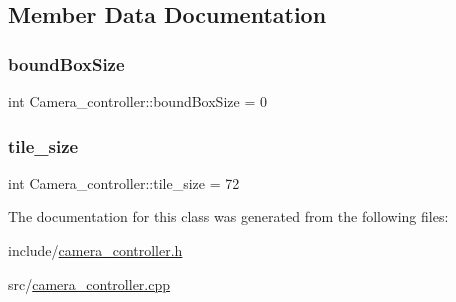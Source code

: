 \subsection{Member Data Documentation}
\mbox{\label{classCamera__controller_a3932aa7665e9edc834373a3e2f42f0e1}} 
\subsubsection{\texorpdfstring{bound\+Box\+Size}{boundBoxSize}}
{\footnotesize\ttfamily int Camera\+\_\+controller\+::bound\+Box\+Size = 0\hspace{0.3cm}{\ttfamily [private]}}

\mbox{\label{classCamera__controller_ae2f8c96d3f03011a11cdcb4c8016fcef}} 
\subsubsection{\texorpdfstring{tile\+\_\+size}{tile\_size}}
{\footnotesize\ttfamily int Camera\+\_\+controller\+::tile\+\_\+size = 72\hspace{0.3cm}{\ttfamily [private]}}



The documentation for this class was generated from the following files\+:\begin{DoxyCompactItemize}
\item 
include/\hyperlink{camera__controller_8h}{camera\+\_\+controller.\+h}\item 
src/\hyperlink{camera__controller_8cpp}{camera\+\_\+controller.\+cpp}\end{DoxyCompactItemize}
